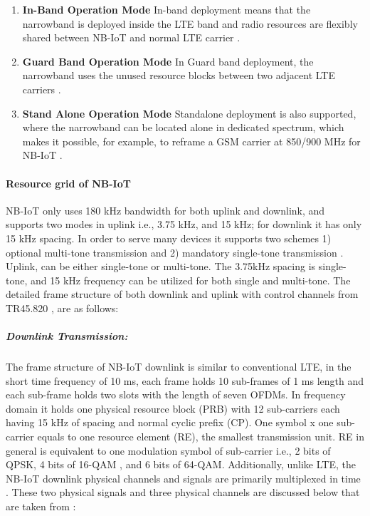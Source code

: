 \documentclass[12pt]{article}
\begin{document}
\begin{enumerate}
    \item \textbf{In-Band Operation Mode}\newline
    In-band deployment means that the narrowband is deployed inside the LTE band and radio resources are flexibly shared between NB-IoT and normal LTE carrier \cite{farrell2018low}.
    \item  \textbf{Guard Band Operation Mode}\newline
    In Guard band deployment, the narrowband uses the unused resource blocks between two adjacent LTE carriers \cite{farrell2018low}.
    \item \textbf{Stand Alone Operation Mode}\newline
    Standalone deployment is also supported, where the narrowband can be located alone in dedicated spectrum, which makes it possible, for example, to reframe a GSM carrier at 850/900 MHz for NB-IoT \cite{farrell2018low}.
\end{enumerate}

\paragraph{Resource grid of NB-IoT} \label{repetition}
NB-IoT only uses 180 kHz bandwidth for both uplink and downlink, and supports two modes in uplink i.e., 3.75 kHz, and 15 kHz; for downlink it has only 15 kHz spacing. In order to serve many devices it supports two schemes 1) optional multi-tone transmission and 2) mandatory single-tone transmission \cite{xu2017narrowband,malik2018radio}. Uplink, can be either single-tone or multi-tone. The 3.75kHz spacing is single-tone, and 15 kHz frequency can be utilized for both single and multi-tone. The detailed frame structure of both downlink and uplink with control channels from TR45.820 \cite{malik2018radio,TR45.820}, are as follows:

\subparagraph{Downlink Transmission:}
The frame structure of NB-IoT downlink is similar to conventional LTE, in the short time frequency of 10 ms, each frame holds 10 sub-frames of 1 ms length and each sub-frame holds two slots with the length of seven OFDMs. In frequency domain it holds one physical resource block (PRB) with 12 sub-carriers each having 15 kHz of spacing and normal cyclic prefix (CP). One symbol x one sub-carrier equals to one resource element (RE), the smallest transmission unit. RE in general is equivalent to one modulation symbol of sub-carrier i.e., 2 bits of QPSK, 4 bits of 16-QAM , and 6 bits of 64-QAM. Additionally, unlike LTE, the NB-IoT downlink physical channels and signals are primarily multiplexed in time \cite{malik2018radio}. These two physical signals and three physical channels are discussed below that are taken from  \cite{malik2018radio,ratasuk2016overview}:
\end{document}
